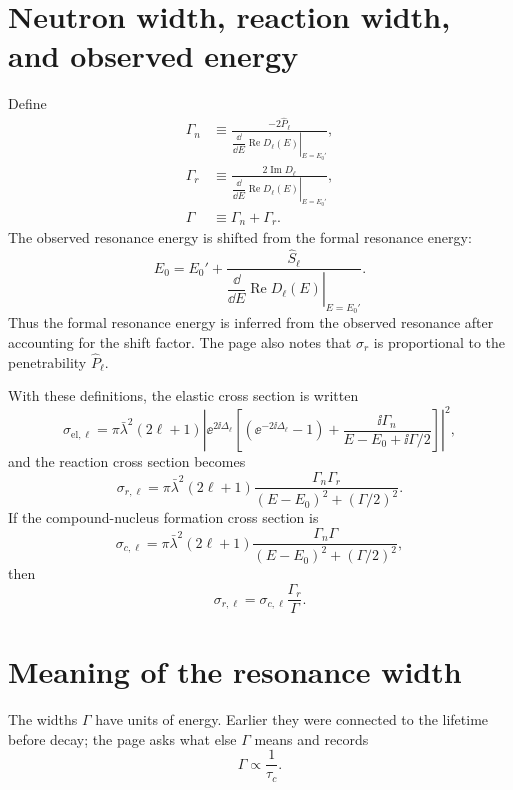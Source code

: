 \section{Neutron width, reaction width, and observed energy}
Define
\begin{align}
  \Gamma_n
  &\equiv
  \frac{-2\widehat P_\ell}
  {\left.
    \dfrac{\dd}{\dd E}\operatorname{Re}D_\ell(E)
   \right|_{E=E_0'}},
  \label{eq:res-neutron-width}\\
  \Gamma_r
  &\equiv
  \frac{2\operatorname{Im}D_\ell}
  {\left.
    \dfrac{\dd}{\dd E}\operatorname{Re}D_\ell(E)
   \right|_{E=E_0'}},
  \label{eq:res-reaction-width}\\
  \Gamma&\equiv\Gamma_n+\Gamma_r.
  \label{eq:res-total-width}
\end{align}
The observed resonance energy is shifted from the formal resonance energy:
\begin{equation}
  E_0
  =E_0'
  +\frac{\widehat S_\ell}
  {\left.
    \dfrac{\dd}{\dd E}\operatorname{Re}D_\ell(E)
   \right|_{E=E_0'}}.
  \label{eq:res-observed-energy}
\end{equation}
Thus the formal resonance energy is inferred from the observed resonance after accounting for the shift factor.  The page also notes that $\sigma_r$ is proportional to the penetrability $\widehat P_\ell$.

With these definitions, the elastic cross section is written
\begin{equation}
  \sigma_{\mathrm{el},\ell}
  =\pi\bar\lambda^2(2\ell+1)
  \left|
    \ee^{2\ii\Delta_\ell}
    \left[
      \left(\ee^{-2\ii\Delta_\ell}-1\right)
      +\frac{\ii\Gamma_n}
       {E-E_0+\ii\Gamma/2}
    \right]
  \right|^2,
  \label{eq:res-elastic-bw}
\end{equation}
and the reaction cross section becomes
\begin{equation}
  \sigma_{r,\ell}
  =\pi\bar\lambda^2(2\ell+1)
  \frac{\Gamma_n\Gamma_r}
  {(E-E_0)^2+(\Gamma/2)^2}.
  \label{eq:res-reaction-bw}
\end{equation}
If the compound-nucleus formation cross section is
\[
  \sigma_{c,\ell}
  =\pi\bar\lambda^2(2\ell+1)
  \frac{\Gamma_n\Gamma}
  {(E-E_0)^2+(\Gamma/2)^2},
\]
then
\begin{equation}
  \sigma_{r,\ell}=\sigma_{c,\ell}\frac{\Gamma_r}{\Gamma}.
  \label{eq:res-branching-xsec}
\end{equation}

\section{Meaning of the resonance width}
The widths $\Gamma$ have units of energy.  Earlier they were connected to the lifetime before decay; the page asks what else $\Gamma$ means and records
\[
  \Gamma\propto\frac{1}{\tau_c}.
\]

